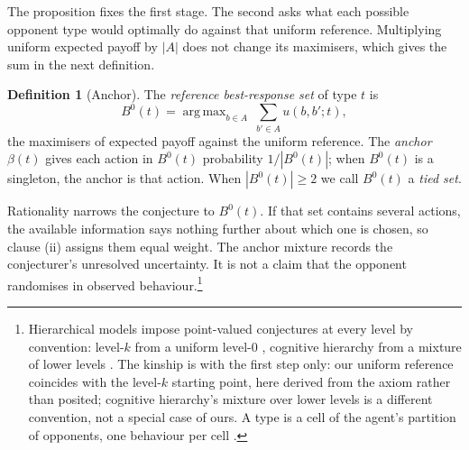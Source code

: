 \documentclass[12pt]{article}
\theoremstyle{definition}
\newtheorem{definition}{Definition}
\DeclareMathOperator*{\argmax}{arg\,max}
\begin{document}
The proposition fixes the first stage. The second asks what each possible opponent type would optimally do against that uniform reference. Multiplying uniform expected payoff by $|A|$ does not change its maximisers, which gives the sum in the next definition.

\begin{definition}[Anchor]\label{def:anchor}
The \emph{reference best-response set} of type $t$ is
\[
B^0(t) = \argmax_{b \in A} \ \sum_{b' \in A} u(b, b'; t),
\]
the maximisers of expected payoff against the uniform reference. The \emph{anchor} $\beta(t)$ gives each action in $B^0(t)$ probability $1/|B^0(t)|$; when $B^0(t)$ is a singleton, the anchor is that action. When $|B^0(t)| \ge 2$ we call $B^0(t)$ a \emph{tied set}.
\end{definition}

Rationality narrows the conjecture to $B^0(t)$. If that set contains several actions, the available information says nothing further about which one is chosen, so clause (ii) assigns them equal weight. The anchor mixture records the conjecturer's unresolved uncertainty. It is not a claim that the opponent randomises in observed behaviour.\footnote{Hierarchical models impose point-valued conjectures at every level by convention: level-$k$ from a uniform level-0 \citep{nagel1995, stahl1995, crawford2007levelk}, cognitive hierarchy from a mixture of lower levels \citep{camerer2004cognitive}. The kinship is with the first step only: our uniform reference coincides with the level-$k$ starting point, here derived from the axiom rather than posited; cognitive hierarchy's mixture over lower levels is a different convention, not a special case of ours. A type is a cell of the agent's partition of opponents, one behaviour per cell \citep[compare][]{jehiel2005analogy}.}
\end{document}
